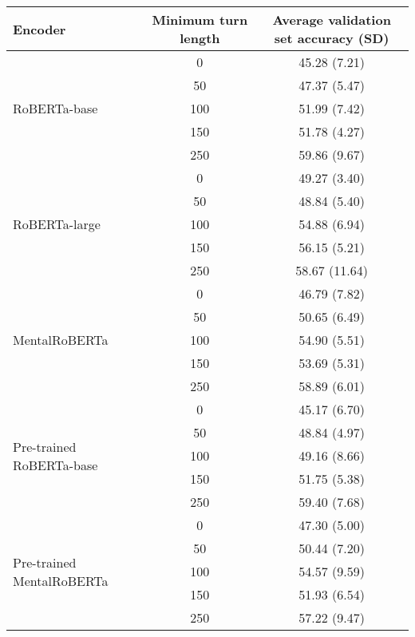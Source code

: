 \begin{tabular}{lcc}
\toprule
Encoder & Minimum turn length & Average validation set accuracy (SD) \\
\midrule
\multirow{5}{*}{RoBERTa-base} & 0 & 45.28 (7.21) \\
& 50 & 47.37 (5.47) \\
& 100 & 51.99 (7.42) \\
& 150 & 51.78 (4.27) \\
& 250 & 59.86 (9.67) \\
\midrule
\multirow{5}{*}{RoBERTa-large} & 0 & 49.27 (3.40) \\
& 50 & 48.84 (5.40) \\
& 100 & 54.88 (6.94) \\
& 150 & 56.15 (5.21) \\
& 250 & 58.67 (11.64) \\
\midrule
\multirow{5}{*}{MentalRoBERTa} & 0 & 46.79 (7.82) \\
& 50 & 50.65 (6.49) \\
& 100 & 54.90 (5.51) \\
& 150 & 53.69 (5.31) \\
& 250 & 58.89 (6.01) \\
\midrule
\multirow{5}{*}{Pre-trained RoBERTa-base} & 0 & 45.17 (6.70) \\
& 50 & 48.84 (4.97) \\
& 100 & 49.16 (8.66) \\
& 150 & 51.75 (5.38) \\
& 250 & 59.40 (7.68) \\
\midrule
\multirow{5}{*}{Pre-trained MentalRoBERTa} & 0 & 47.30 (5.00) \\
& 50 & 50.44 (7.20) \\
& 100 & 54.57 (9.59) \\
& 150 & 51.93 (6.54) \\
& 250 & 57.22 (9.47) \\
\bottomrule
\end{tabular}
